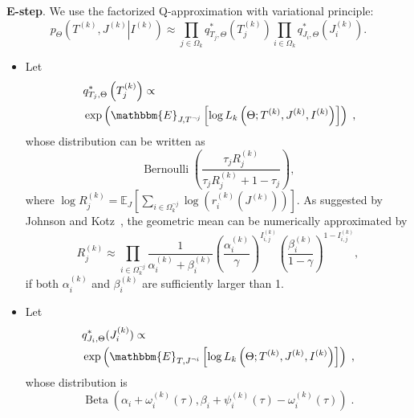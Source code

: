 \documentclass[10pt,journal,letterpaper,compsoc,twoside]{IEEEtran}
\newcommand{\nobracket}{}
\newcommand{\tmop}[1]{\ensuremath{\operatorname{#1}}}
\newcommand{\tmtextbf}[1]{{\bfseries{#1}}}
\newenvironment{itemizedot}{\begin{itemize} \renewcommand{\labelitemi}{$\bullet$}\renewcommand{\labelitemii}{$\bullet$}\renewcommand{\labelitemiii}{$\bullet$}\renewcommand{\labelitemiv}{$\bullet$}}{\end{itemize}}
\begin{document}
\tmtextbf{E-step}. We use the factorized Q-approximation with variational
principle: 
\begin{equation}
p_{\Theta} \left( T^{( k )} ,J^{( k )} \left\lvert I^{( k )} \right.\nobracket \right) \approx
  \prod_{j \in \Omega_{k}} q^{\ast}_{T_{j} , \Theta} \left( T_{j}^{( k )} \right)
  \prod_{i \in \Omega_{k}} q^{\ast}_{J_{i} , \Theta} \left( J_{i}^{( k )} \right) .
\end{equation}
\begin{itemizedot}
  \item Let 
  \begin{equation}~\label{eq:qt}
  \begin{split}
 & q^{\ast}_{T_{j},\Theta} \left( T_{j}^{( k )} \right) \propto \\
 & \exp
  \left( \mathbbm{E}_{J,T^{\neg j}} \left[ \log  L_{k} \left( \Theta ;T^{( k )} ,J^{( k )}
  ,I^{( k )} \right) \right] \right)\;, 
\end{split}
\end{equation}
whose distribution can be written as 
  \[\tmop{Bernoulli}
  \left( \dfrac{\tau_{j} R_{j}^{( k )}}{\tau_{j} R_{j}^{( k )} +1-
  \tau_{j}} \right),\] where $\log R_j^{(k)}=\mathbb E_{J}\left[\sum_{i\in \Omega_k^{\neg j}} \log \left(r_i^{(k)} (J^{(k)})\right)\right]$.
  As suggested by Johnson and Kotz~\citep{johnson1995chapter}, the geometric mean can be numerically approximated by
 \begin{equation}
R_{j}^{( k )} \approx \prod\limits_{i\in\Omega_k^{\neg j}} \dfrac{1}{\alpha_i^{(k)} + \beta_i^{(k)}}
  \left(\dfrac{\alpha_i^{(k)}}{\gamma}\right)^{I_{i,j}^{(k)}}\left(\dfrac{\beta_i^{(k)}}{1-\gamma}\right)^{1-I_{i,j}^{(k)}},
  \label{eq:Rapprox}
\end{equation}
if both $\alpha_i^{(k)}$ and $\beta_i^{(k)}$ are sufficiently larger than 1. 
    
  \item Let 
\begin{equation}
  \begin{split}
 & q^{\ast}_{J_{i},\Theta} ( J_{i}^{( k )} ) \propto \\
 & \exp
  \left( \mathbbm{E}_{T,J^{\neg i}} \left[ \log  L_{k} \left( \Theta ;T^{( k )} ,J^{( k )}
  ,I^{( k )} \right) \right] \right)\;,
  \end{split}
\end{equation}
  whose distribution is
  \[ \tmop{Beta} ( \alpha_{i} + \omega_{i}^{( k )} ( \tau ) , \beta_{i} +
     \psi_{i}^{( k )} ( \tau ) - \omega_{i}^{( k )} ( \tau ) )\; . \]
\end{itemizedot}
\end{document}
